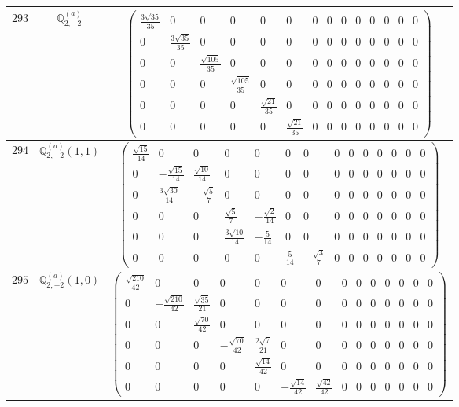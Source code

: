 \documentclass[fleqn,8pt,landscape]{jsarticle}
\begin{document}
\begin{center}
\begin{longtable}{ccc}
$ 293 $ & $ \mathbb{Q}_{2,-2}^{(a)} $ & $ \begin{pmatrix} \frac{3 \sqrt{35}}{35} & 0 & 0 & 0 & 0 & 0 & 0 & 0 & 0 & 0 & 0 & 0 & 0 & 0 \\ 0 & \frac{3 \sqrt{35}}{35} & 0 & 0 & 0 & 0 & 0 & 0 & 0 & 0 & 0 & 0 & 0 & 0 \\ 0 & 0 & \frac{\sqrt{105}}{35} & 0 & 0 & 0 & 0 & 0 & 0 & 0 & 0 & 0 & 0 & 0 \\ 0 & 0 & 0 & \frac{\sqrt{105}}{35} & 0 & 0 & 0 & 0 & 0 & 0 & 0 & 0 & 0 & 0 \\ 0 & 0 & 0 & 0 & \frac{\sqrt{21}}{35} & 0 & 0 & 0 & 0 & 0 & 0 & 0 & 0 & 0 \\ 0 & 0 & 0 & 0 & 0 & \frac{\sqrt{21}}{35} & 0 & 0 & 0 & 0 & 0 & 0 & 0 & 0 \end{pmatrix} $ \\ \hline
$ 294 $ & $ \mathbb{Q}_{2,-2}^{(a)}(1,1) $ & $ \begin{pmatrix} \frac{\sqrt{15}}{14} & 0 & 0 & 0 & 0 & 0 & 0 & 0 & 0 & 0 & 0 & 0 & 0 & 0 \\ 0 & - \frac{\sqrt{15}}{14} & \frac{\sqrt{10}}{14} & 0 & 0 & 0 & 0 & 0 & 0 & 0 & 0 & 0 & 0 & 0 \\ 0 & \frac{3 \sqrt{30}}{14} & - \frac{\sqrt{5}}{7} & 0 & 0 & 0 & 0 & 0 & 0 & 0 & 0 & 0 & 0 & 0 \\ 0 & 0 & 0 & \frac{\sqrt{5}}{7} & - \frac{\sqrt{2}}{14} & 0 & 0 & 0 & 0 & 0 & 0 & 0 & 0 & 0 \\ 0 & 0 & 0 & \frac{3 \sqrt{10}}{14} & - \frac{5}{14} & 0 & 0 & 0 & 0 & 0 & 0 & 0 & 0 & 0 \\ 0 & 0 & 0 & 0 & 0 & \frac{5}{14} & - \frac{\sqrt{3}}{7} & 0 & 0 & 0 & 0 & 0 & 0 & 0 \end{pmatrix} $ \\ \hline
$ 295 $ & $ \mathbb{Q}_{2,-2}^{(a)}(1,0) $ & $ \begin{pmatrix} \frac{\sqrt{210}}{42} & 0 & 0 & 0 & 0 & 0 & 0 & 0 & 0 & 0 & 0 & 0 & 0 & 0 \\ 0 & - \frac{\sqrt{210}}{42} & \frac{\sqrt{35}}{21} & 0 & 0 & 0 & 0 & 0 & 0 & 0 & 0 & 0 & 0 & 0 \\ 0 & 0 & \frac{\sqrt{70}}{42} & 0 & 0 & 0 & 0 & 0 & 0 & 0 & 0 & 0 & 0 & 0 \\ 0 & 0 & 0 & - \frac{\sqrt{70}}{42} & \frac{2 \sqrt{7}}{21} & 0 & 0 & 0 & 0 & 0 & 0 & 0 & 0 & 0 \\ 0 & 0 & 0 & 0 & \frac{\sqrt{14}}{42} & 0 & 0 & 0 & 0 & 0 & 0 & 0 & 0 & 0 \\ 0 & 0 & 0 & 0 & 0 & - \frac{\sqrt{14}}{42} & \frac{\sqrt{42}}{42} & 0 & 0 & 0 & 0 & 0 & 0 & 0 \end{pmatrix} $ \\ \hline

\end{longtable}
\end{center}
\end{document}
